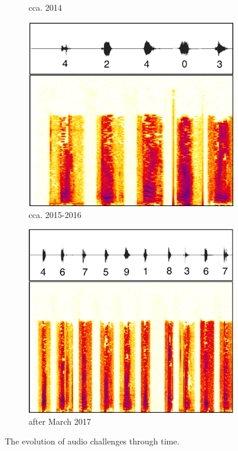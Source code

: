 \begin{figure}[tp]
\begin{subfigure}{0.24\textwidth}
\caption{\re cca. 2014}
\label{fig:botdetect}
\end{subfigure}\hspace{0.01\textwidth}
\begin{subfigure}{0.24\textwidth}
\includegraphics[width=\textwidth]{figures/recaptcha_evolution/2016.pdf}
\caption{\re cca. 2015-2016}
\label{fig:captchas}
\end{subfigure}
\begin{subfigure}{0.24\textwidth}
\includegraphics[width=\textwidth]{figures/recaptcha_evolution/2017.pdf}
\caption{\re after March 2017}
\label{fig:live}
\end{subfigure}
\caption{The evolution of \re audio challenges through time.}
\label{fig:evolution}
\end{figure}


